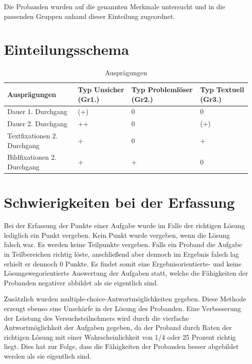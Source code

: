 Die Probanden wurden auf die genannten Merkmale untersucht und in die passenden Gruppen anhand dieser Einteilung zugeordnet.
\section*{Einteilungsschema}

\begin{table}[!h]
\hspace{-5pt}
\begin{tabularx}{\textwidth + 5pt}{| @{\hspace{3pt}} M || @{\hspace{3pt}} M  | @{\hspace{3pt}} M  | @{\hspace{3pt}} M |}
\hline
\textbf{Ausprägungen} & \textbf{Typ Unsicher (Gr1.)} & \textbf{Typ Problemlöser (Gr2.)} & \textbf{Typ Textuell (Gr3.)}\\
\hline
\hline
Dauer 1. Durchgang          & (+) & 0 & 0\\
\hline
Dauer 2. Durchgang          & ++ & 0 & (+)\\
\hline
Textfixationen 2. Durchgang & + & 0 & +\\
\hline
Bildfixationen 2. Durchgang & + & + & 0\\
\hline
\end{tabularx}
\caption{Ausprägungen}
\end{table}



\section{Schwierigkeiten bei der Erfassung}

Bei der Erfassung der Punkte einer Aufgabe wurde im Falle der richtigen Lösung lediglich ein Punkt vergeben. Kein Punkt wurde vergeben, wenn die Lösung falsch war. Es werden keine Teilpunkte vergeben. Falls ein Proband die Aufgabe in Teilbereichen richtig löste, anschließend aber dennoch im Ergebnis falsch lag erhielt er dennoch 0 Punkte. Es findet somit eine Ergebnisorientierte- und keine Lösungswegorientierte Auswertung der Aufgaben statt, welche die Fähigkeiten der Probanden negativer abbildet als sie eigentlich sind.

Zusätzlich wurden multiple-choice-Antwortmöglichkeiten gegeben. Diese Methode erzeugt ebenso eine Unschärfe in der Lösung des Probanden. Eine Verbesserung der Leistung des Versuchsteilnehmers wird durch die vierfache Antwortmöglichkeit der Aufgaben gegeben, da der Proband durch Raten der richtigen Lösung mit einer Wahrscheinlichkeit von 1/4 oder 25 Prozent richtig liegt. Dies hat zur Folge, dass die Fähigkeiten der Probanden besser abgebildet werden als sie eigentlich sind.  

